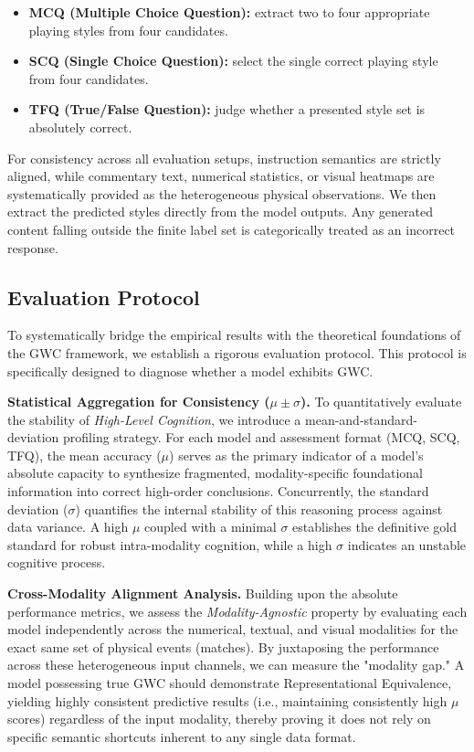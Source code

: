 \begin{itemize}
\item \textbf{MCQ (Multiple Choice Question):} extract two to four appropriate playing styles from four candidates.
\item \textbf{SCQ (Single Choice Question):} select the single correct playing style from four candidates.
\item \textbf{TFQ (True/False Question):} judge whether a presented style set is absolutely correct.
\end{itemize}

For consistency across all evaluation setups, instruction semantics are strictly aligned, while commentary text, numerical statistics, or visual heatmaps are systematically provided as the heterogeneous physical observations. We then extract the predicted styles directly from the model outputs. Any generated content falling outside the finite label set is categorically treated as an incorrect response.


\subsection{Evaluation Protocol}
To systematically bridge the empirical results with the theoretical foundations of the GWC framework, we establish a rigorous evaluation protocol. This protocol is specifically designed to diagnose whether a model exhibits GWC.


\textbf{Statistical Aggregation for Consistency ($\mu \pm \sigma$).}
To quantitatively evaluate the stability of \textit{High-Level Cognition}, we introduce a mean-and-standard-deviation profiling strategy. For each model and assessment format (MCQ, SCQ, TFQ), the mean accuracy ($\mu$) serves as the primary indicator of a model's absolute capacity to synthesize fragmented, modality-specific foundational information into correct high-order conclusions. Concurrently, the standard deviation ($\sigma$) quantifies the internal stability of this reasoning process against data variance. A high $\mu$ coupled with a minimal $\sigma$ establishes the definitive gold standard for robust intra-modality cognition, while a high $\sigma$ indicates an unstable cognitive process.

\textbf{Cross-Modality Alignment Analysis.} 
Building upon the absolute performance metrics, we assess the \textit{Modality-Agnostic} property by evaluating each model independently across the numerical, textual, and visual modalities for the exact same set of physical events (matches). By juxtaposing the performance across these heterogeneous input channels, we can measure the "modality gap." A model possessing true GWC should demonstrate Representational Equivalence, yielding highly consistent predictive results (i.e., maintaining consistently high $\mu$ scores) regardless of the input modality, thereby proving it does not rely on specific semantic shortcuts inherent to any single data format.


